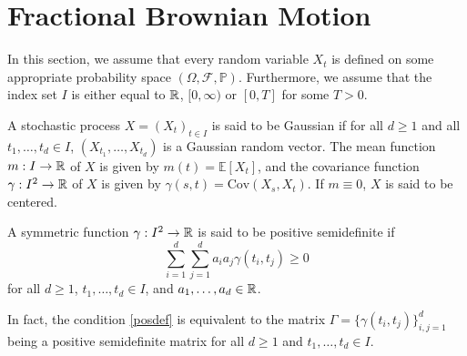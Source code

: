 \section{Fractional Brownian Motion}
In this section, we assume that every random variable $X_{t}$ is defined on some appropriate probability space $(\Omega, \mathcal{F},\mathbb{P})$. Furthermore, we assume that the index set $I$ is either equal to $\mathbb{R}$, $[0,\infty)$ or $[0,T]$ for some $T>0$. 
\begin{defn}
    A stochastic process $X=(X_{t})_{t\in I}$ is said to be Gaussian if for all $d\geq 1$ and all $t_{1},\dots,t_{d}\in I$, $(X_{t_{1}},\dots,X_{t_{d}})$ is a Gaussian random vector. The mean function $m: I\to \mathbb{R}$ of $X$ is given by $m(t)=\mathbb{E}[X_{t}]$, and the covariance function $\gamma: I^{2}\to\mathbb{R}$ of $X$ is given by $\gamma(s,t)=\textrm{Cov}(X_{s},X_{t})$. If $m\equiv 0$, $X $ is said to be centered.
\end{defn}

\begin{defn}
    A symmetric function $\gamma: I^{2}\to \mathbb{R}$ is said to be positive semidefinite if
    \begin{equation}\label{posdef}
        \sum_{i=1}^{d}\sum_{j=1}^{d}a_{i}a_{j}\gamma(t_{i},t_{j})\geq 0
    \end{equation}
    for all $d\geq 1$, $t_{1},\dots,t_{d}\in I$, and $a_{1},\dots,a_{d}\in\mathbb{R}$.
\end{defn}
In fact, the condition \eqref{posdef} is equivalent to the matrix $\Gamma=\big\{\gamma (t_{i},t_{j})\big\}_{i,j=1}^{d}$ being a positive semidefinite matrix for all $d\geq 1$ and $t_{1},\dots,t_{d}\in I$.

